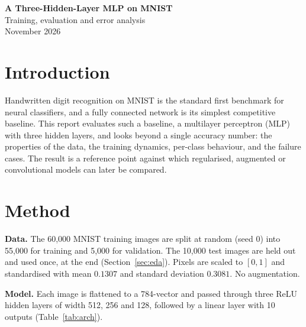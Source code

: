 \documentclass[10pt, a4paper]{article}
\begin{document}

\begin{center}
  {\sffamily\LARGE\bfseries A Three-Hidden-Layer MLP on MNIST}\\[0.6em]
  {\large Training, evaluation and error analysis}\\[0.3em]
  {\small\color{black!60} November 2026}
\end{center}
\vspace{1em}

\begin{abstract}\noindent
A plain fully connected network with three hidden layers ($784\to512\to256\to128\to10$, 567{,}434 parameters)
reaches \textbf{97.95\%} test accuracy on MNIST, with the training epoch selected on a held-out validation set and the test set used once. Training takes about 21 seconds on an Apple GPU.
This report documents the protocol, the data, the training curves, and where the remaining 205 errors come from.
\end{abstract}

\section{Introduction}

Handwritten digit recognition on MNIST is the standard first benchmark for neural classifiers, and a fully connected network is its simplest competitive baseline. This report evaluates such a baseline, a multilayer perceptron (MLP) with three hidden layers, and looks beyond a single accuracy number: the properties of the data, the training dynamics, per-class behaviour, and the failure cases. The result is a reference point against which regularised, augmented or convolutional models can later be compared.

\section{Method}\label{sec:method}

\textbf{Data.} The 60{,}000 MNIST training images are split at random (seed 0) into 55{,}000 for training and 5{,}000 for validation. The 10{,}000 test images are held out and used once, at the end (Section~\ref{sec:eda}). Pixels are scaled to $[0,1]$ and standardised with mean $0.1307$ and standard deviation $0.3081$. No augmentation.

\textbf{Model.} Each image is flattened to a 784-vector and passed through three ReLU hidden layers of width 512, 256 and 128, followed by a linear layer with 10 outputs (Table~\ref{tab:arch}).
\end{document}
